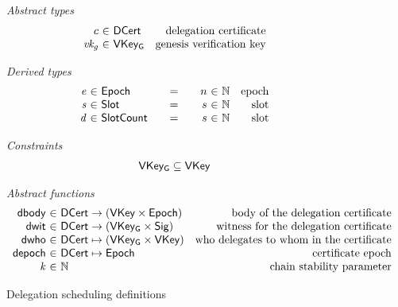 \begin{figure}[htb]
  \emph{Abstract types}
  \begin{equation*}
    \begin{array}{r@{~\in~}lr}
      c & \DCert & \text{delegation certificate}\\
      \var{vk_g} & \VKeyGen & \text{genesis verification key}\\
    \end{array}
  \end{equation*}

  \emph{Derived types}
  \begin{equation*}
    \begin{array}{r@{~\in~}l@{\qquad=\qquad}r@{~\in~}lr}
      \var{e} & \Epoch & n & \mathbb{N} & \text{epoch}\\
      \var{s} & \Slot & s & \mathbb{N} & \text{slot}\\
      \var{d} & \SlotCount & s & \mathbb{N} & \text{slot}
    \end{array}
  \end{equation*}

  \emph{Constraints}
  \begin{align*}
    \mathsf{VKey_G} \subseteq \mathsf{VKey}
  \end{align*}

  \emph{Abstract functions}
  \begin{equation*}
    \begin{array}{r@{~\in~}lr}
      \fun{dbody} & \DCert \to (\VKey \times \Epoch)
      & \text{body of the delegation certificate}\\
      \fun{dwit} & \DCert \to (\VKeyGen \times \Sig)
      & \text{witness for the delegation certificate}\\
      \fun{dwho} & \DCert \mapsto (\VKeyGen \times \VKey)
      & \text{who delegates to whom in the certificate}\\
      \fun{depoch} & \DCert \mapsto \Epoch
      & \text{certificate epoch}\\
      \var{k} & \mathbb{N} & \text{chain stability parameter}
    \end{array}
  \end{equation*}
  \caption{Delegation scheduling definitions}
  \label{fig:defs:delegation-scheduling}
\end{figure}

